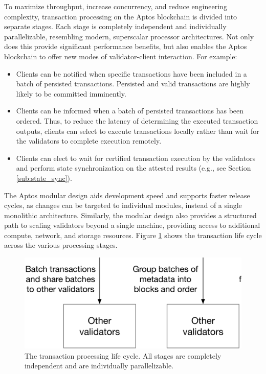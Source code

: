 \documentclass{article}
\begin{document}
To maximize throughput, increase concurrency, and reduce engineering complexity, transaction processing on the Aptos blockchain is divided into separate stages. Each stage is completely independent and individually parallelizable, resembling modern, superscalar processor architectures. Not only does this provide significant performance benefits, but also enables the Aptos blockchain to offer new modes of validator-client interaction. For example:
\begin{itemize}
\item Clients can be notified when specific transactions have been included in a batch of persisted transactions. Persisted and valid transactions are highly likely to be committed imminently.
\item Clients can be informed when a batch of persisted transactions has been ordered. Thus, to reduce the latency of determining the executed transaction outputs, clients can select to execute transactions locally rather than wait for the validators to complete execution remotely.
\item Clients can elect to wait for certified transaction execution by the validators and perform state synchronization on the attested results (e.g., see Section \ref{sub:state_sync}).
\end{itemize}
The Aptos modular design aids development speed and supports faster release cycles, as changes can be targeted to individual modules, instead of a single monolithic architecture. Similarly, the modular design also provides a structured path to scaling validators beyond a single machine, providing access to additional compute, network, and storage resources. Figure \ref{fig:pipeline} shows the transaction life cycle across the various processing stages.

\begin{figure}
\centering
\includegraphics[width=1.0\textwidth]{pipeline.eps}
\caption{\label{fig:pipeline}The transaction processing life cycle. All stages are completely independent and are individually parallelizable.}
\end{figure}
\end{document}
